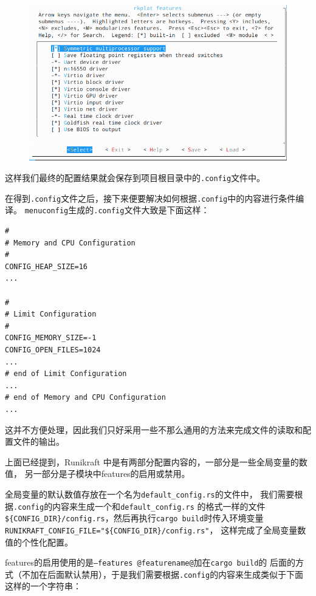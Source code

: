 \documentclass{../runikraft-report}
\begin{document}
\begin{figure}[H]
\centering
\includegraphics[width=0.7\linewidth]{../assets/runikraft-menuconfig-2.png}
\caption{}
\label{fig:runikraft-menuconfig-2}
\end{figure}

这样我们最终的配置结果就会保存到项目根目录中的\texttt{.config}文件中。

在得到\texttt{.config}文件之后，接下来便要解决如何根据\texttt{.config}中的内容进行条件编译。
\texttt{menuconfig}生成的\texttt{.config}文件大致是下面这样：

\begin{lstlisting}[language={[gnu]make}]
#
# Memory and CPU Configuration
#
CONFIG_HEAP_SIZE=16
...

#
# Limit Configuration
#
CONFIG_MEMORY_SIZE=-1
CONFIG_OPEN_FILES=1024
...
# end of Limit Configuration
...
# end of Memory and CPU Configuration
...
\end{lstlisting}

这并不方便处理，因此我们只好采用一些不那么通用的方法来完成文件的读取和配置文件的输出。

上面已经提到，Runikraft 中是有两部分配置内容的，一部分是一些全局变量的数值，
另一部分是子模块中features的启用或禁用。

全局变量的默认数值存放在一个名为\texttt{default\_config.rs}的文件中，
我们需要根据\linebreak\texttt{.config}的内容来生成一个和\texttt{default\_config.rs}
的格式一样的文件\texttt{\$\{CONFIG\_DIR\}/\linebreak config.rs}，然后再执行\texttt{cargo build}时传入环境变量\texttt{RUNIKRAFT\_CONFIG\_FILE=\linebreak"\$\{CONFIG\_DIR\}/config.rs"}，
这样完成了全局变量数值的个性化配置。

features的启用使用的是\texttt{--features @featurename@}加在\texttt{cargo build}的
后面的方式（不加在后面默认禁用），于是我们需要根据\texttt{.config}的内容来生成类似于下面这样的一个字符串：
\end{document}
